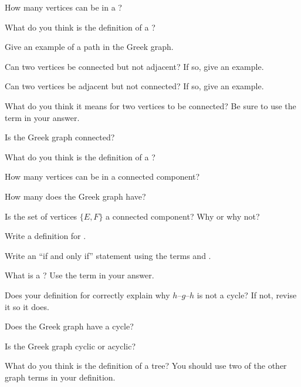 \documentclass{tufte-handout}
\begin{document}
\begin{questions}
\item How many vertices can be in a ?
\item What do you think is the definition of a ?
\item Give an example of a path in the Greek graph.
\item Can two vertices be connected but not adjacent?  If so, give an
  example.
\item Can two vertices be adjacent but not connected?  If so, give an
  example.
\item What do you think it means for two vertices to be connected?  Be
  sure to use the term  in your answer.
\item Is the Greek graph connected?
\item What do you think is the definition of a ?
\item How many vertices can be in a connected component?
\item How many  does the Greek graph have?
\item Is the set of vertices $\{E, F\}$ a connected component?  Why or
  why not?
\item Write a definition for .
\item Write an ``if and only if'' statement using the terms
   and .
\item What is a ?  Use the term  in your
  answer.
\item Does your definition for  correctly explain why
  $h$--$g$--$h$ is not a cycle?  If not, revise it so it does.
  \newpage
\item Does the Greek graph have a cycle?
\item Is the Greek graph cyclic or acyclic?
\item What do you think is the definition of a tree?  You should use
  two of the other graph terms in your
  definition.
\end{questions}
\end{document}
